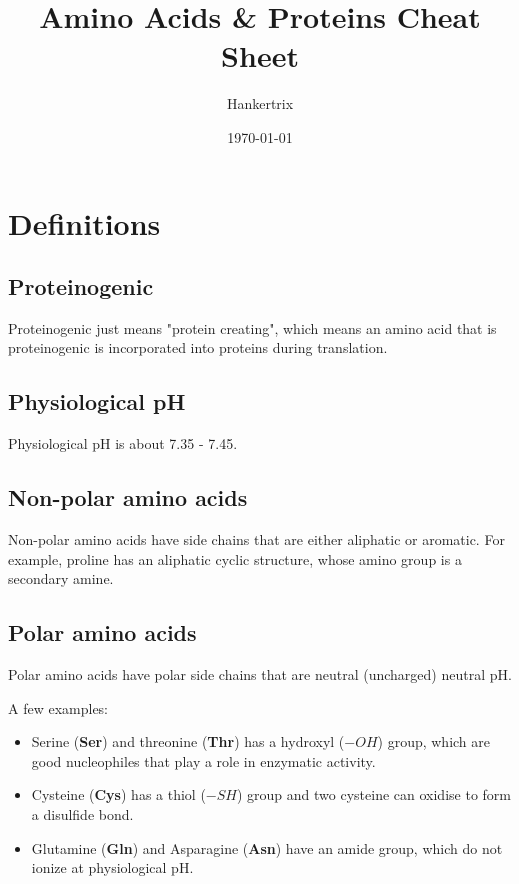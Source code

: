 \documentclass[11pt]{article}
\author{Hankertrix}
\date{\today}
\title{Amino Acids \& Proteins Cheat Sheet}
\begin{document}
\maketitle
\setcounter{tocdepth}{2}
\tableofcontents \clearpage\newpage

\section{Definitions}
\label{sec:org8bb74f4}

\subsection{Proteinogenic}
\label{sec:org1bbfe07}
Proteinogenic just means "protein creating", which means an amino acid that is proteinogenic is incorporated into proteins during translation.

\subsection{Physiological pH}
\label{sec:org17e9920}
Physiological pH is about 7.35 - 7.45.

\subsection{Non-polar amino acids}
\label{sec:org5828f89}
Non-polar amino acids have side chains that are either aliphatic or aromatic. For example, proline has an aliphatic cyclic structure, whose amino group is a secondary amine.

\subsection{Polar amino acids}
\label{sec:org48d2d78}
Polar amino acids have polar side chains that are neutral (uncharged) neutral pH.

A few examples:
\begin{itemize}
\item Serine (\textbf{Ser}) and threonine (\textbf{Thr}) has a hydroxyl (\(-OH\)) group, which are good nucleophiles that play a role in enzymatic activity.
\item Cysteine (\textbf{Cys}) has a thiol (\(-SH\)) group and two cysteine can oxidise to form a disulfide bond.
\item Glutamine (\textbf{Gln}) and Asparagine (\textbf{Asn}) have an amide group, which do not ionize at physiological pH.
\end{itemize}
\end{document}
